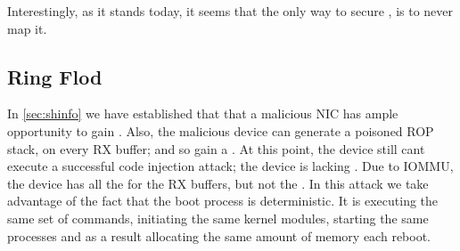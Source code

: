 Interestingly, as it stands today, it seems that the only way to secure \shinfo, is to never map it.

\subsection{Ring Flod}\label{sec:ringflod}
In \ref{sec:shinfo} we have established that that a malicious NIC has ample opportunity to gain \oportunity.
Also, the malicious device can generate a poisoned ROP stack, on every RX buffer; and so gain a \motivation{}. At this point, the device still cant execute a successful code injection attack; the device is lacking \means{}. Due to IOMMU, the device has all the \iova{} for the RX buffers, but not the \kva{}.
In this attack we take advantage of the fact that the boot process is deterministic. It is executing the same set of commands, initiating the same kernel modules, starting the same processes and as a result allocating the same amount of memory each reboot.





